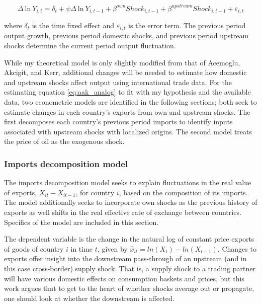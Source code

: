 \documentclass[10pt,letterpaper,pdftex]{article}
\begin{document}
\begin{equation} \label{eq:aak_analog}
\Delta \ \text{ln} \ Y_{i,t} = \delta_t + \psi \Delta \ \text{ln} \ Y_{i,t-1} + \beta^{own}Shock_{i,t-1} + \beta^{upstream}Shock_{i,t-1} + \varepsilon_{i,t}
\end{equation} 

where $\delta_t$ is the time fixed effect and $\varepsilon_{i,t}$ is the error term. The previous period output growth, previous period domestic shocks, and previous period upstream shocks determine the current period output fluctuation.

While my theoretical model is only slightly modified from that of Acemoglu, Akcigit, and Kerr, additional changes will be needed to estimate how domestic and upstream shocks affect output using international trade data. For the estimating equation \ref{eq:aak_analog} to fit with my hypothesis and the available data, two econometric models are identified in the following sections; both seek to estimate changes in each country's exports from own and upstream shocks. The first decomposes each country's previous period imports to identify inputs associated with upstream shocks with localized origins. The second model treats the price of oil as the exogenous shock. 

\subsubsection{Imports decomposition model} \label{imports_decomp}

The imports decomposition model seeks to explain fluctuations in the real value of exports, $X_{it} - X_{it-1}$, for country $i$, based on the composition of its imports. The model additionally seeks to incorporate own shocks as the previous history of exports as well shifts in the real effective rate of exchange between countries. Specifics of the model are included in this section.

The dependent variable is the change in the natural log of constant price exports of goods of country $i$ in time $t$, given by $\hat{x}_{it} = ln(X_t) - ln(X_{t-1})$. Changes to exports offer insight into the downstream pass-through of an upstream (and in this case cross-border) supply shock. That is, a supply shock to a trading partner will have various domestic effects on consumption baskets and prices, but this work argues that to get to the heart of whether shocks average out or propagate, one should look at whether the downstream is affected.
\end{document}
